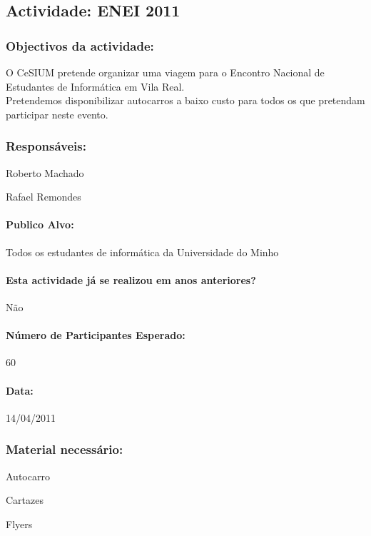 \subsection{Actividade: ENEI 2011} %

\subsubsection*{Objectivos da actividade:}
\indent O CeSIUM pretende organizar uma viagem para o Encontro Nacional de Estudantes de Informática em Vila Real.\\
\indent Pretendemos disponibilizar autocarros a baixo custo para todos os que pretendam participar neste evento.

\subsubsection*{Responsáveis:}
\begin{itemizedash}
	\item{Roberto Machado}
	\item{Rafael Remondes}
\end{itemizedash}

\paragraph{Publico Alvo: }
Todos os estudantes de informática da Universidade do Minho

\paragraph{Esta actividade já se realizou em anos anteriores?}
Não

\paragraph{Número de Participantes Esperado:}
60
\paragraph{Data:} 14/04/2011

\subsubsection*{Material necessário:}
\begin{itemizedash}
	\item{Autocarro}
	\item{Cartazes}
	\item{Flyers}
\end{itemizedash}

